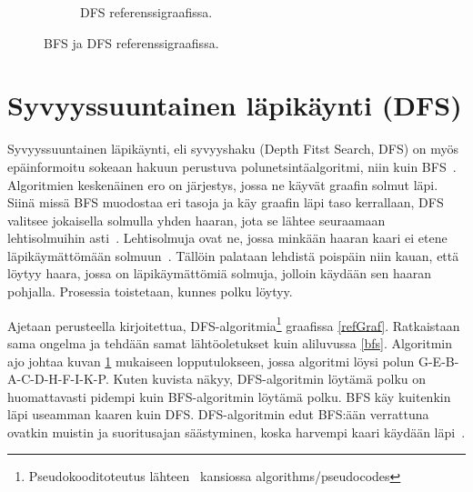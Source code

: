 \begin{figure}
\begin{subfigure}[b]{0.3\textwidth}
		\caption{DFS referenssigraafissa.}\label{refDFS}
	\end{subfigure}
	\caption{BFS ja DFS referenssigraafissa.}\label{refPlusBasics}
\end{figure}

\section{Syvyyssuuntainen läpikäynti (DFS)}\label{dfs}
Syvyyssuuntainen läpikäynti, eli syvyyshaku (Depth Fitst Search, DFS) on 
myös epäinformoitu sokeaan hakuun perustuva polunetsintäalgoritmi, niin kuin 
BFS~\cite{applSciLawande}. Algoritmien keskenäinen ero on  järjestys, jossa ne 
käyvät graafin solmut läpi. Siinä missä BFS muodostaa eri tasoja ja käy 
graafin läpi taso kerrallaan, DFS valitsee jokaisella solmulla yhden haaran, 
jota se lähtee seuraamaan lehtisolmuihin asti~\cite{DFSMapColoring}. 
Lehtisolmuja ovat ne, jossa minkään haaran kaari ei etene läpikäymättömään 
solmuun~\cite{DFSMapColoring}. Tällöin palataan lehdistä poispäin niin kauan, 
että löytyy haara, jossa on läpikäymättömiä solmuja, jolloin käydään sen 
haaran pohjalla. Prosessia toistetaan, kunnes polku löytyy. \par
	Ajetaan \textcite{DFSMapColoring} perusteella kirjoitettua, 
DFS-algoritmia\footnote{Pseudokooditoteutus lähteen~\cite{gt2} kansiossa 
algorithms/pseudocodes} graafissa \ref{refGraf}. Ratkaistaan sama ongelma ja 
tehdään samat lähtöoletukset kuin aliluvussa \ref{bfs}. Algoritmin ajo johtaa 
kuvan \ref{refDFS} mukaiseen lopputulokseen, jossa algoritmi löysi polun 
G-E-B-A-C-D-H-F-I-K-P. Kuten kuvista näkyy, DFS-algoritmin löytämä polku on 
huomattavasti pidempi kuin BFS-algoritmin löytämä polku. BFS käy kuitenkin 
läpi useamman kaaren kuin DFS. DFS-algoritmin edut BFS:ään verrattuna ovatkin 
muistin ja suoritusajan säästyminen, koska harvempi kaari käydään 
läpi~\cite{applSciLawande}.

